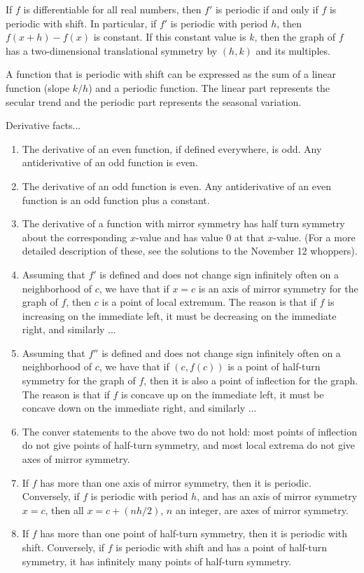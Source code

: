 \documentclass[10pt]{amsart}
\begin{document}
\begin{enumerate}
  If $f$ is differentiable for all real numbers, then $f'$ is periodic
  if and only if $f$ is periodic with shift. In particular, if $f'$ is
  periodic with period $h$, then $f(x + h) - f(x)$ is constant. If
  this constant value is $k$, then the graph of $f$ has a
  two-dimensional translational symmetry by $(h,k)$ and its multiples.

  A function that is periodic with shift can be expressed as the sum
  of a linear function (slope $k/h$) and a periodic function. The
  linear part represents the secular trend and the periodic part
  represents the seasonal variation.
\end{enumerate}

Derivative facts...

\begin{enumerate}
\item The derivative of an even function, if defined everywhere, is
  odd. Any antiderivative of an odd function is even.
\item The derivative of an odd function is even. Any antiderivative of
  an even function is an odd function plus a constant.
\item The derivative of a function with mirror symmetry has half turn
  symmetry about the corresponding $x$-value and has value $0$ at that
  $x$-value. (For a more detailed description of these, see the
  solutions to the November 12 whoppers).
\item Assuming that $f'$ is defined and does not change sign
  infinitely often on a neighborhood of $c$, we have that if $x = c$
  is an axis of mirror symmetry for the graph of $f$, then $c$ is a
  point of local extremum. The reason is that if $f$ is increasing on
  the immediate left, it must be decreasing on the immediate right,
  and similarly ...
\item Assuming that $f''$ is defined and does not change sign
  infinitely often on a neighborhood of $c$, we have that if
  $(c,f(c))$ is a point of half-turn symmetry for the graph of $f$,
  then it is also a point of inflection for the graph. The reason is
  that if $f$ is concave up on the immediate left, it must be concave
  down on the immediate right, and similarly ...
\item The conver statements to the above two do not hold: most points
  of inflection do not give points of half-turn symmetry, and most
  local extrema do not give axes of mirror symmetry.
\item If $f$ has more than one axis of mirror symmetry, then it is
  periodic. Conversely, if $f$ is periodic with period $h$, and has an
  axis of mirror symmetry $x = c$, then all $x = c + (nh/2)$, $n$ an
  integer, are axes of mirror symmetry.
\item If $f$ has more than one point of half-turn symmetry, then it is
  periodic with shift. Conversely, if $f$ is periodic with shift and
  has a point of half-turn symmetry, it has infinitely many points of
  half-turn symmetry.
\end{enumerate}
\end{document}
